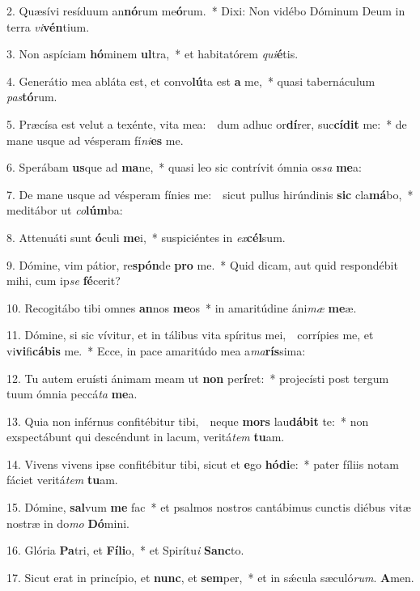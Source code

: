
2. Quæsívi resíduum an\textbf{nó}rum me\textbf{ó}rum.~* Dixi: Non vidébo Dóminum Deum in terra \textit{vi}\textbf{vén}tium.

3. Non aspíciam \textbf{hó}minem \textbf{ul}tra,~* et habitatórem \textit{qui}\textbf{é}tis.

4. Generátio mea abláta est, et convo\textbf{lú}ta est \textbf{a} me,~* quasi tabernáculum \textit{pas}\textbf{tó}rum.

5. Præcísa est velut a texénte, vita mea:~\GreDagger\ dum adhuc or\textbf{dí}rer, suc\textbf{cí}\textbf{dit} me:~* de mane usque ad vésperam fí\textit{ni}\textbf{es} me.

6. Sperábam \textbf{us}que ad \textbf{ma}ne,~* quasi leo sic contrívit ómnia os\textit{sa} \textbf{me}a:

7. De mane usque ad vésperam fínies me:~\GreDagger\ sicut pullus hirúndinis \textbf{sic} cla\textbf{má}bo,~* meditábor ut \textit{co}\textbf{lúm}ba:

8. Attenuáti sunt \textbf{ó}culi \textbf{me}i,~* suspiciéntes in \textit{ex}\textbf{cél}sum.

9. Dómine, vim pátior, re\textbf{spón}de \textbf{pro} me.~* Quid dicam, aut quid respondébit mihi, cum ip\textit{se} \textbf{fé}cerit?

10. Recogitábo tibi omnes \textbf{an}nos \textbf{me}os~* in amaritúdine áni\textit{mæ} \textbf{me}æ.

11. Dómine, si sic vívitur, et in tálibus vita spíritus mei,~\GreDagger\ corrípies me, et vi\textbf{vi}fi\textbf{cá}\textbf{bis} me.~* Ecce, in pace amaritúdo mea a\textit{ma}\textbf{rís}sima:

12. Tu autem eruísti ánimam meam ut \textbf{non} per\textbf{í}ret:~* projecísti post tergum tuum ómnia peccá\textit{ta} \textbf{me}a.

13. Quia non inférnus confitébitur tibi,~\GreDagger\ neque \textbf{mors} lau\textbf{dá}\textbf{bit} te:~* non exspectábunt qui descéndunt in lacum, veritá\textit{tem} \textbf{tu}am.

14. Vivens vivens ipse confitébitur tibi, sicut et \textbf{e}go \textbf{hó}\textbf{di}e:~* pater fíliis notam fáciet veritá\textit{tem} \textbf{tu}am.

15. Dómine, \textbf{sal}vum \textbf{me} fac~* et psalmos nostros cantábimus cunctis diébus vitæ nostræ in do\textit{mo} \textbf{Dó}mini.

16. Glória \textbf{Pa}tri, et \textbf{Fí}\textbf{li}o,~* et Spirítu\textit{i} \textbf{Sanc}to.

17. Sicut erat in princípio, et \textbf{nunc}, et \textbf{sem}per,~* et in s\'{\ae}cula sæculó\textit{rum}. \textbf{A}men.
